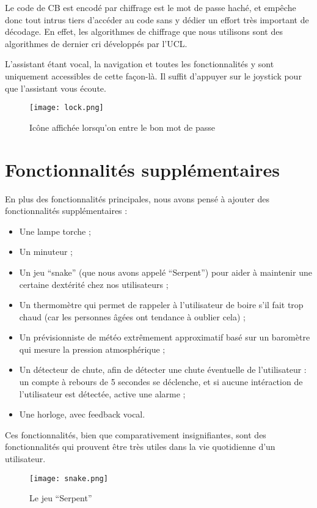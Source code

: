 \documentclass[11pt]{scrartcl} %
\begin{document}
Le code de CB est encodé par chiffrage est le mot de passe haché, et empêche donc tout intrus tiers d'accéder au code sans y dédier un effort très important de décodage.
En effet, les algorithmes de chiffrage que nous utilisons sont des algorithmes de dernier cri développés par l'UCL.

L'assistant étant vocal, la navigation et toutes les fonctionnalités y sont uniquement accessibles de cette façon-là.
Il suffit d'appuyer sur le joystick pour que l'assistant vous écoute.

\begin{figure}[ht]
	\centering
	\texttt{[image: lock.png]}
	\caption{Icône affichée lorsqu'on entre le bon mot de passe}
\end{figure}

\section{Fonctionnalités supplémentaires}

En plus des fonctionnalités principales, nous avons pensé à ajouter des fonctionnalités supplémentaires :
\begin{itemize}
    \item Une lampe torche ;
    \item Un minuteur ;
    \item Un jeu ``snake'' (que nous avons appelé ``Serpent'') pour aider à maintenir une certaine dextérité chez nos utilisateurs ;
    \item Un thermomètre qui permet de rappeler à l'utilisateur de boire s'il fait trop chaud (car les personnes âgées ont tendance à oublier cela) ;
    \item Un prévisionniste de météo extrêmement approximatif basé sur un baromètre qui mesure la pression atmosphérique ;
    \item Un détecteur de chute, afin de détecter une chute éventuelle de l'utilisateur : un compte à rebours de 5 secondes se déclenche, et si aucune intéraction de l'utilisateur est détectée, active une alarme ;
    \item Une horloge, avec feedback vocal.
\end{itemize}

Ces fonctionnalités, bien que comparativement insignifiantes, sont des fonctionnalités qui prouvent être très utiles dans la vie quotidienne d'un utilisateur.

\begin{figure}[ht]
	\centering
	\texttt{[image: snake.png]}
	\caption{Le jeu ``Serpent''}
\end{figure}
\end{document}

